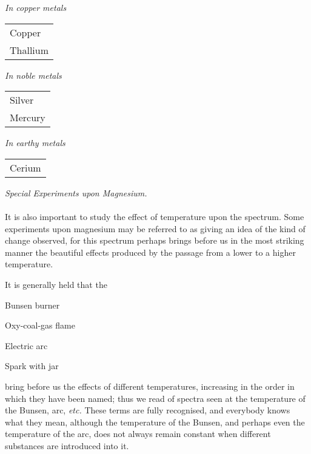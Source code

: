 \documentclass[a4paper, 12pt, oneside, polutonikogreek, english]{article}
\begin{document}
\emph{In copper metals} 
\begin{table}[H]
    \centering
    \begin{tabular}{l}
    Copper \\
    Thallium \\
    \end{tabular}
\end{table}

\emph{In noble metals}
\begin{table}[H]
    \centering
    \begin{tabular}{l}
    Silver \\
    Mercury \\
    \end{tabular}
\end{table}

\emph{In earthy metals} 
\begin{table}[H]
    \centering
    \begin{tabular}{l}
    Cerium  \\
    \end{tabular}
\end{table}

\vspace{3mm}

\begin{center}
\emph{Special Experiments upon Magnesium.}
\end{center}
\paragraph{}
It is also important to study the effect of temperature upon the spectrum. Some experiments upon magnesium may be referred to as giving an idea of the kind of change observed, for this spectrum perhaps brings before us in the most striking manner the beautiful effects produced by the passage from a lower to a higher temperature.

It is generally held that the

Bunsen burner

Oxy-coal-gas flame

Electric arc

Spark with jar

bring before us the effects of different temperatures, increasing in the order in which they have been named; thus we read of spectra seen at the temperature of the Bunsen, arc, \emph{etc.} These terms are fully recognised, and everybody knows what they mean, although the temperature of the Bunsen, and perhaps even the temperature of the arc, does not always remain constant when different substances are introduced into it.
\end{document}
